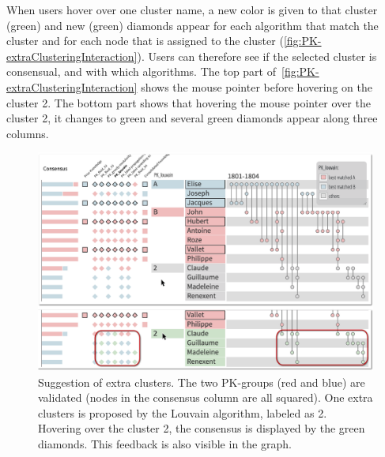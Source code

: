 When users hover over one cluster name, a new color is given to that cluster (\eg green) and new (green) diamonds appear for each algorithm that match the cluster and for each node that is assigned to the cluster (\autoref{fig:PK-extraClusteringInteraction}).
Users can therefore see if the selected cluster is consensual, and with which algorithms.  The top part of~\autoref{fig:PK-extraClusteringInteraction} shows the mouse pointer before hovering on the cluster 2. The bottom part shows that hovering the mouse pointer over the cluster 2, it changes to green and several green diamonds appear along three columns.


\begin{figure}
\centering
\includegraphics[width=\linewidth]{static/figures/PK-Clustering/VISPaperFigures/Small-extraClusters-01.png}
\caption{Suggestion of extra clusters. The two PK-groups (red and blue) are validated (nodes in the consensus column are all squared). One extra clusters is proposed by the Louvain algorithm, labeled as 2. Hovering over the cluster 2, the consensus is displayed by the green diamonds. This feedback is also visible in the graph.}
\label{fig:PK-extraClusteringInteraction}
\end{figure}

